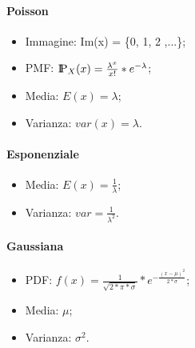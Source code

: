 \paragraph{Poisson}

\begin{itemize}
    \item Immagine: Im(x) = \{0, 1, 2 ,...\};
    \item PMF: $\text{I\kern-0.2 em P}_X(x) = \frac{\lambda^x}{x!} * e^{-\lambda}$;
    \item Media: $E(x) = \lambda$;
    \item Varianza: $var(x) = \lambda$.
\end{itemize}

\paragraph{Esponenziale}

\begin{itemize}
    \item Media: $E(x) = \frac{1}{\lambda}$;
    \item Varianza: $var = \frac{1}{\lambda^2}$.
\end{itemize}

\paragraph{Gaussiana}

\begin{itemize}
    \item PDF: $f(x) = \frac{1}{\sqrt{2 * \pi * \sigma}} * e^{-\frac{(x - \mu)^2}{2 * \sigma}}$;
    \item Media: $\mu$;
    \item Varianza: $\sigma^2$.
\end{itemize}
